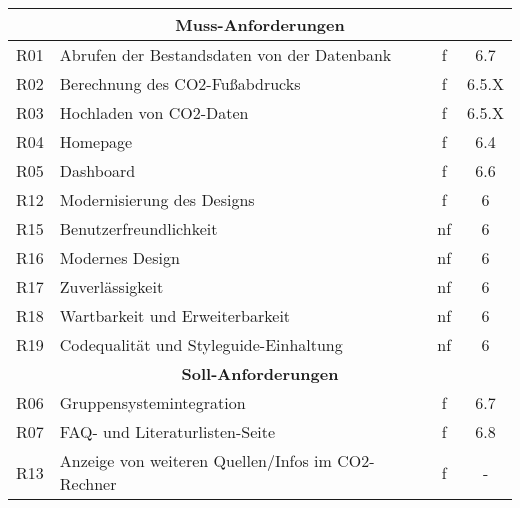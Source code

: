 \begin{longtable}{|c|l|c|c|}
    \multicolumn{4}{|c|}{\textbf{Muss-Anforderungen}}                                                           \\
    \hline
    R01                  & Abrufen der Bestandsdaten von der Datenbank          & f            & 6.7            \\
    \hline
    R02                  & Berechnung des CO2-Fußabdrucks                       & f            & 6.5.X          \\
    \hline
    R03                  & Hochladen von CO2-Daten                              & f            & 6.5.X          \\
    \hline
    R04                  & Homepage                                             & f            & 6.4            \\
    \hline
    R05                  & Dashboard                                            & f            & 6.6            \\
    \hline
    R12                  & Modernisierung des Designs                           & f            & 6              \\
    \hline
    R15                  & Benutzerfreundlichkeit                               & nf           & 6              \\
    \hline
    R16                  & Modernes Design                                      & nf           & 6              \\
    \hline
    R17                  & Zuverlässigkeit                                      & nf           & 6              \\
    \hline
    R18                  & Wartbarkeit und Erweiterbarkeit                      & nf           & 6              \\
    \hline
    R19                  & Codequalität und Styleguide-Einhaltung               & nf           & 6              \\
    \hline
    \multicolumn{4}{|c|}{\textbf{Soll-Anforderungen}}                                                           \\
    \hline
    R06                  & Gruppensystemintegration                             & f            & 6.7            \\
    \hline
    R07                  & FAQ- und Literaturlisten-Seite                       & f            & 6.8            \\
    \hline
    R13                  & Anzeige von weiteren Quellen/Infos im CO2-Rechner    & f            & -              \\

\end{longtable}
